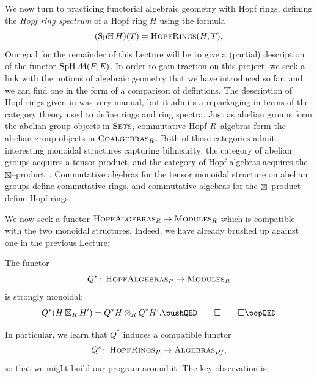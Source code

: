 


We now turn to practicing functorial algebraic geometry with Hopf rings, defining the \textit{Hopf ring spectrum} of a Hopf ring \(H\) using the formula \[(\operatorname{SpH} H)(T) = \normalfont\textsc{HopfRings}(H, T).\]
Our goal for the remainder of this Lecture will be to give a (partial) description of the functor \(\operatorname{SpH} A\!\!A(F, E)\).
In order to gain traction on this project, we seek a link with the notions of algebraic geometry that we have introduced so far, and we can find one in the form of a comparison of defintions.
The description of Hopf rings given in  was very manual, but it admits a repackaging in terms of the category theory used to define rings and ring spectra.
Just as abelian groups form the abelian group objects in \(\normalfont\textsc{Sets}\), commutative Hopf \(R\)--algebras form the abelian group objects in \(\normalfont\textsc{Coalgebras}_R\).
Both of these categories admit interesting monoidal structures capturing bilinearity: the category of abelian groups acquires a tensor product, and the category of Hopf algebras acquires the \(\boxtimes\)--product~\cite[Section 5]{GoerssDieudonne}.
Commutative algebras for the tensor monoidal structure on abelian groups define commutative rings, and commutative algebras for the \(\boxtimes\)--product define Hopf rings.

We now seek a functor \(\normalfont\textsc{HopfAlgebras}_R \to \normalfont\textsc{Modules}_R\) which is compatible with the two monoidal structures.
Indeed, we have already brushed up against one in the previous Lecture:

\begin{lemma}
The functor \[Q^*\colon\thinspace \normalfont\textsc{HopfAlgebras}_R \to \normalfont\textsc{Modules}_R\] is strongly monoidal: \[Q^*(H \boxtimes_R H') = Q^* H \otimes_R Q^* H'. \pushQED\qed\qedhere\popQED\]
\end{lemma}

\noindent In particular, we learn that \(Q^*\) induces a compatible functor \[Q^*\colon\thinspace \normalfont\textsc{HopfRings}_R \to \normalfont\textsc{Algebras}_{R/},\] so that we might build our program around it.
The key observation is:

